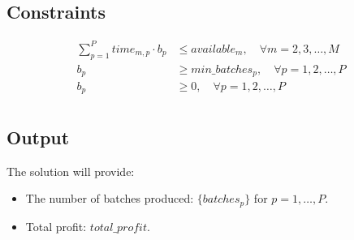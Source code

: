 \documentclass{article}
\begin{document}
\subsection*{Constraints}
\begin{align*}
\sum_{p=1}^{P} time_{m,p} \cdot b_p & \leq available_m, \quad \forall m = 2, 3, \ldots, M \\
b_p & \geq min\_batches_p, \quad \forall p = 1, 2, \ldots, P \\
b_p & \geq 0, \quad \forall p = 1, 2, \ldots, P \\
\end{align*}

\subsection*{Output}
The solution will provide:
\begin{itemize}
    \item The number of batches produced: \( \{batches_p\} \) for \( p = 1, \ldots, P \).
    \item Total profit: \( total\_profit \).
\end{itemize}
\end{document}
